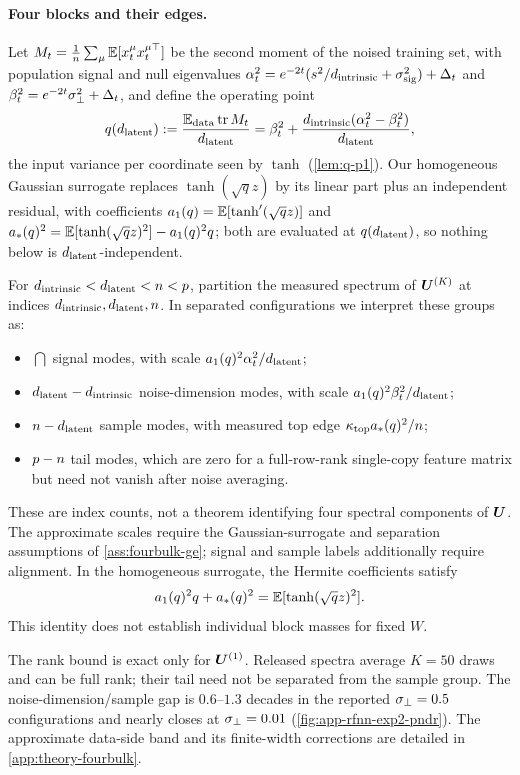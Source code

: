 \paragraph{Four blocks and their edges.}\label{sec:theory-fourbulk}
Let $M_t=\tfrac1{n}\sum_\mu\mathbb{E}[x^\mu_tx^{\mu\top}_t]$ be the second moment of the noised training set, with population signal and null eigenvalues $\alpha_t^2=e^{-2t}(s^2/d_{\mathrm{intrinsic}}+\sigma_{\mathrm{sig}}^2)+\Delta_t$ and $\beta_t^2=e^{-2t}\sigma_{\perp}^2+\Delta_t$, and define the operating point
\begin{equation}\label{eq:fourbulk-q-main}
q(d_{\mathrm{latent}}):=\frac{\mathbb{E}_{\rm data}\operatorname{tr}M_t}{d_{\mathrm{latent}}}=\beta_t^2+\frac{d_{\mathrm{intrinsic}}(\alpha_t^2-\beta_t^2)}{d_{\mathrm{latent}}},
\end{equation}
the input variance per coordinate seen by $\tanh$ (\cref{lem:q-p1}). Our homogeneous Gaussian surrogate replaces $\tanh(\sqrt q z)$ by its linear part plus an independent residual, with coefficients $a_1(q)=\mathbb{E}[\tanh'(\sqrt qz)]$ and $a_*(q)^2=\mathbb{E}[\tanh(\sqrt qz)^2]-a_1(q)^2q$; both are evaluated at $q(d_{\mathrm{latent}})$, so nothing below is $d_{\mathrm{latent}}$-independent.

\begin{remark}\label{prop:fourblock-9}\label{prop:fourbulk-main}
For $d_{\mathrm{intrinsic}}<d_{\mathrm{latent}}<n<p$, partition the measured spectrum of $\bm{U}^{(K)}$ at indices $d_{\mathrm{intrinsic}},d_{\mathrm{latent}},n$. In separated configurations we interpret these groups as:
\begin{itemize}\setlength\itemsep{0pt}
\item[(i)] $\dint$ signal modes, with scale $a_1(q)^2\alpha_t^2/d_{\mathrm{latent}}$;
\item[(ii)] $d_{\mathrm{latent}}-d_{\mathrm{intrinsic}}$ noise-dimension modes, with scale $a_1(q)^2\beta_t^2/d_{\mathrm{latent}}$;
\item[(iii)] $n-d_{\mathrm{latent}}$ sample modes, with measured top edge $\kappa_{\rm top}a_*(q)^2/n$;
\item[(iv)] $p-n$ tail modes, which are zero for a full-row-rank single-copy feature matrix but need not vanish after noise averaging.
\end{itemize}
These are index counts, not a theorem identifying four spectral components of $\bm{U}$. The approximate scales require the Gaussian-surrogate and separation assumptions of \cref{ass:fourbulk-ge}; signal and sample labels additionally require alignment. In the homogeneous surrogate, the Hermite coefficients satisfy
\begin{equation}\label{eq:fourbulk-trace-main}
a_1(q)^2q+a_*(q)^2=\mathbb{E}[\tanh(\sqrt qz)^2].
\end{equation}
This identity does not establish individual block masses for fixed $W$.
\end{remark}
The rank bound is exact only for $\bm{U}^{(1)}$. Released spectra average $K=50$ draws and can be full rank; their tail need not be separated from the sample group. The noise-dimension/sample gap is $0.6$--$1.3$ decades in the reported $\sigma_{\perp}=0.5$ configurations and nearly closes at $\sigma_{\perp}=0.01$ (\cref{fig:app-rfnn-exp2-pndr}).\label{cor:fourbulk-separation-main} The approximate data-side band and its finite-width corrections are detailed in \cref{app:theory-fourbulk}.

